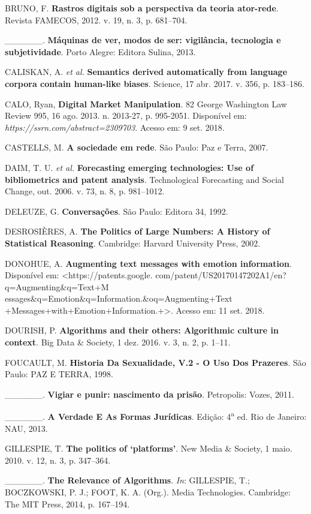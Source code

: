 BRUNO, F. \textbf{Rastros digitais sob a perspectiva da teoria
ator-rede}. Revista FAMECOS, 2012. v. 19, n. 3, p. 681--704.

\_\_\_\_\_\_. \textbf{Máquinas de ver, modos de ser: vigilância,
tecnologia e subjetividade}. Porto Alegre: Editora Sulina, 2013.

CALISKAN, A. \emph{et al.} \textbf{Semantics derived automatically from
language corpora contain human-like biases}. Science, 17 abr. 2017. v.
356, p. 183--186.

CALO, Ryan, \textbf{Digital Market Manipulation}. 82 George Washington
Law Review 995, 16 ago. 2013. n. 2013-27, p. 995-2051. Disponível em:
\emph{https://ssrn.com/abstract=2309703}. Acesso em: 9 set. 2018.

CASTELLS, M. \textbf{A sociedade em rede}. São Paulo: Paz e Terra, 2007.

DAIM, T. U. \emph{et al.} \textbf{Forecasting emerging technologies: Use
of bibliometrics and patent analysis}. Technological Forecasting and
Social Change, out. 2006. v. 73, n. 8, p. 981--1012.

DELEUZE, G. \textbf{Conversações}. São Paulo: Editora 34, 1992.

DESROSIÈRES, A. \textbf{The Politics of Large Numbers: A History of
Statistical Reasoning}. Cambridge: Harvard University Press, 2002.

DONOHUE, A. \textbf{Augmenting text messages with emotion information}.
Disponível em:
\textless{}https://patents.google.
com/patent/US20170147202A1/en?q=Augmenting\&q=Text+M
essages\&q=Emotion\&q=Information.\&oq=Augmenting+Text
+Messages+with+Emotion+Information.+\textgreater{}.
Acesso em: 11 set. 2018.

DOURISH, P. \textbf{Algorithms and their others: Algorithmic culture in
context}. Big Data \& Society, 1 dez. 2016. v. 3, n. 2, p. 1--11.

FOUCAULT, M. \textbf{Historia Da Sexualidade, V.2 - O Uso Dos Prazeres}.
São Paulo: PAZ E TERRA, 1998.

\_\_\_\_\_\_. \textbf{Vigiar e punir: nascimento da prisão}. Petropolis:
Vozes, 2011.

\_\_\_\_\_\_. \textbf{A Verdade E As Formas Jurídicas}. Edição:
4\textsuperscript{a} ed. Rio de Janeiro: NAU, 2013.

GILLESPIE, T. \textbf{The politics of `platforms'}. New Media \&
Society, 1 maio. 2010. v. 12, n. 3, p. 347--364.

\_\_\_\_\_\_. \textbf{The Relevance of Algorithms}. \emph{In}:
GILLESPIE, T.; BOCZKOWSKI, P. J.; FOOT, K. A. (Org.). Media
Technologies. Cambridge: The MIT Press, 2014, p. 167--194.

